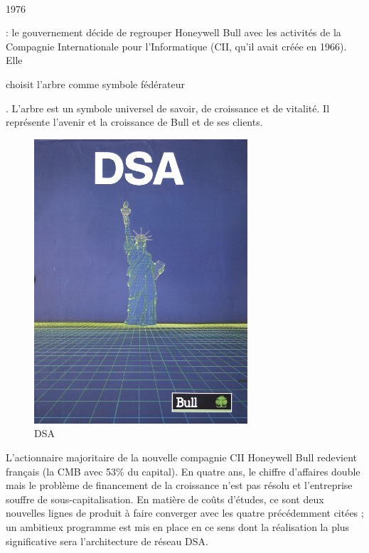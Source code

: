 \documentclass{article}
\begin{document}
		\paragraph{}
		\begin{bf}1976\end{bf}: le gouvernement décide de regrouper Honeywell Bull avec les activités de la Compagnie 
		Internationale pour l’Informatique (CII, qu’il avait créée en 1966). Elle \begin{bf}choisit l’arbre comme symbole 
		fédérateur\end{bf}. L’arbre est un symbole universel de savoir, de croissance et de vitalité. Il représente l’avenir 
		et la croissance de Bull et de ses clients.\newline{}
		\begin{figure}
		\includegraphics[scale=0.25]{dsa_vf.jpg}
		\caption{DSA}
		\end{figure} 
		L’actionnaire majoritaire de la nouvelle compagnie CII Honeywell Bull redevient français (la CMB avec 53\% du capital). 
		En quatre ans, le chiffre d’affaires double mais le problème de financement de la croissance n’est pas résolu et 
		l’entreprise souffre de sous-capitalisation. En matière de coûts d’études, ce sont deux nouvelles lignes de produit à 
		faire converger avec les quatre précédemment citées ; un ambitieux programme est mis en place en ce sens dont la 
		réalisation la plus significative sera l’architecture de réseau DSA.
		\newline{}
		\newline{}
		\newline{}
		\newline{}
		\newline{}
		\newline{}
\end{document}
